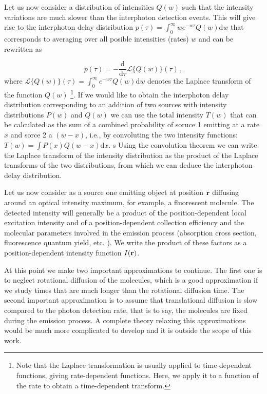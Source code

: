 Let us now consider a distribution of intensities $Q(w)$ such that the intensity variations are much 
slower than the interphoton detection events. This will give rise to the interphoton delay distribution 
$p(\tau)=\int_0^\infty w e^{-w\tau}Q(w)\mbox{d}w$ that corresponds to averaging over all posible intensities 
(rates) $w$ and can be rewritten as

\begin{equation}
p(\tau)=-\frac{\mbox{d}}{\mbox{d}\tau}\mathscr{L}\{Q(w)\}(\tau)\,,
\label{eq:interphoton_delay_distribution}
\end{equation} 
where $\mathscr{L}\{Q(w)\}(\tau)=\int_0^\infty e^{-w\tau}Q(w)\mbox{d}w$ denotes the 
Laplace transform of the function $Q(w)$ \footnote{Note that the Laplace transformation
is usually applied to time-dependent functions, giving rate-dependent functions. 
Here, we apply it to a function of the rate to obtain a time-dependent transform.}. 
If we would like to obtain the interphoton delay distribution 
corresponding to an addition of two sources with intensity distributions $P(w)$ and $Q(w)$ we can
use the total intensity $T(w)$ that can be calculated as the sum of a combined probability of soruce 1 
emitting at a rate $x$ and sorce 2 a $(w-x)$, i.e., by convoluting the two intensity functions: 
$T(w)=\int{P(x)Q(w-x)\mbox{d}x}$. s
Using the convolution theorem we can write the Laplace transform of the intensity distribution 
as the product of the Laplace transforms of the two distributions, from which we can deduce 
the interphoton delay distribution.

Let us now consider as a source one emitting object at position ${\mathbf{r}}$ diffusing around an optical intensity maximum, for example, a fluorescent molecule. The detected intensity will generally be a product of the position-dependent local excitation intensity and of a position-dependent collection efficiency and the molecular parameters involved in the emission process (absorption cross section, fluorescence quantum yield, etc. ). 
We write the product of these factors as a position-dependent intensity function $I({\mathbf{r}})$. 

At this point we make two important approximations to continue. The first one is to neglect rotational diffusion of the molecules, which is a good approximation if we study times that are much longer than the rotational diffusion time. The second important approximation is to assume that translational diffusion is slow compared to the photon detection rate, that is to say, the molecules are fixed during the emission process. A complete theory relaxing this approximations would be much more complicated to develop and it is outside the scope of this work.

